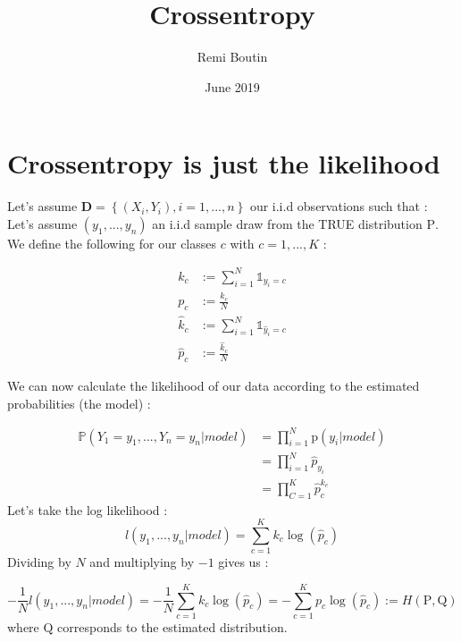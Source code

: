 \documentclass[11pt]{article}
\title{Crossentropy}
\author{Remi Boutin}
\date{June 2019}
\begin{document}
\maketitle

\section{Crossentropy is just the likelihood}

Let's assume $\mathbf{D} =  \left\{(X_i,Y_i), i=1,...,n \right\}$ our i.i.d observations such that :  
Let's assume $ (y_1,...,y_n) $ an i.i.d sample draw from the TRUE distribution $\mathrm{P}$. We define the following for our classes $c$ with $c=1,...,K$  :

\begin{equation}
\begin{split}
k_c & := \sum_{i=1}^{N} \mathbb{1}_{y_i=c}\\ 
p_c & := \frac{k_c}{N}\\
\hat{k}_c & := \sum_{i=1}^{N} \mathbb{1}_{\hat{y}_i=c}\\
\hat{p}_c & := \frac{\hat{k}_c}{N} 
\end{split}
\end{equation}

We can now calculate the likelihood of our data according to the estimated probabilities (the model) : 

\begin{equation}
\begin{split}
    \mathbb{P}( Y_1=y_1,...,Y_n=y_n | model) & = \prod_{i=1}^{N} \mathrm{p}( y_i | model)\\
    & =  \prod_{i=1}^{N}  \hat{p}_{y_i}\\
    & =  \prod_{C=1}^{K} \hat{p}_{c}^{k_c}
\end{split}
\end{equation}
Let's take the log likelihood :
\begin{equation}
    l(y_1,...,y_n| model) = \sum_{c=1}^{K} k_c \log(\hat{p}_{c})
\end{equation}
Dividing by $N$ and multiplying by $-1$ gives us : 

\begin{equation}
    - \frac{1}{N}l(y_1,...,y_n| model)  = - \frac{1}{N} \sum_{c=1}^{K} k_c \log(\hat{p}_{c})
     = - \sum_{c=1}^{K} p_c \log(\hat{p}_{c}) := H(\mathrm{P},\mathrm{Q})
\end{equation}
where $\mathrm{Q}$ corresponds to the estimated distribution.\baselineskip 
\end{document}
